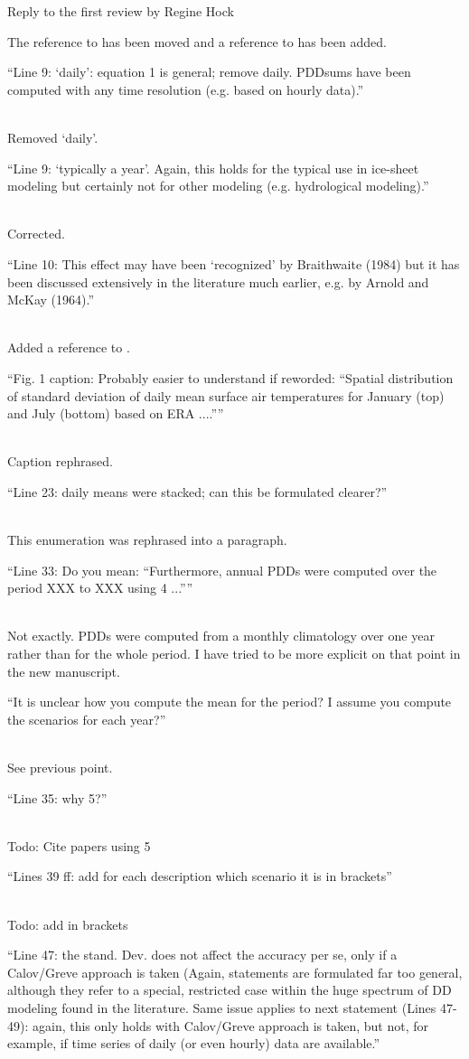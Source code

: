 \documentclass{letter}
\newcommand{\rev}[0]{\color{blue!50!black}\it}
\newcommand{\revpoint}[1]{{\rev\item``#1''}\\}
\newcommand{\todo}[1]{\textcolor{red!50!black}{Todo: #1}\\}
\begin{document}
\begin{letter}{Reply to the first review by Regine Hock}
\begin{enumerate}[resume]
    The reference to \citet{braithwaite-1984} has been moved and a reference to \citet{hock-2003} has been added.

    \revpoint{Line 9: ‘daily’: equation 1 is general; remove daily. PDDsums have been computed with any time resolution (e.g. based on hourly data).}

    Removed `daily'.

    \revpoint{Line 9: ‘typically a year’. Again, this holds for the typical use in ice-sheet modeling but certainly not for other modeling (e.g. hydrological modeling).}

    Corrected.

    \revpoint{Line 10: This effect may have been ‘recognized’ by Braithwaite (1984) but it has been discussed extensively in the literature much earlier, e.g. by Arnold and McKay (1964).}

    Added a reference to \citet{arnold-mackay-1964}.

    \revpoint{Fig. 1 caption: Probably easier to understand if reworded: “Spatial distribution of standard deviation of daily mean surface air temperatures for January (top) and July (bottom) based on ERA ....”}

    Caption rephrased.

    \revpoint{Line 23: daily means were stacked; can this be formulated clearer?}

    This enumeration was rephrased into a paragraph.

    \revpoint{Line 33: Do you mean: “Furthermore, annual PDDs were computed over the period XXX to XXX using 4 ...”}

    Not exactly. PDDs were computed from a monthly climatology over one year rather than for the whole period. I have tried to be more explicit on that point in the new manuscript.

    \revpoint{It is unclear how you compute the mean for the period? I assume you compute the scenarios for each year?}

    See previous point.

    \revpoint{Line 35: why 5?}

    \todo{Cite papers using 5}

    \revpoint{Lines 39 ff: add for each description which scenario it is in brackets}

    \todo{add in brackets}

    \revpoint{Line 47: the stand. Dev. does not affect the accuracy per se, only if a Calov/Greve approach is taken (Again, statements are formulated far too general, although they refer to a special, restricted case within the huge spectrum of DD modeling found in the literature. Same issue applies to next statement (Lines 47- 49): again, this only holds with Calov/Greve approach is taken, but not, for example, if time series of daily (or even hourly) data are available.}


\end{enumerate}
\end{letter}
\end{document}
